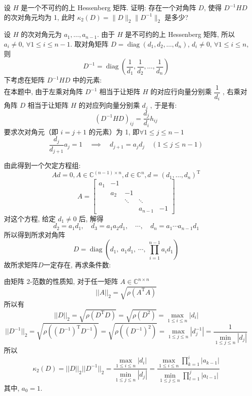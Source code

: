 \documentclass[12pt, answers]{exam}     %
\newcommand{\diag}{\operatorname{diag}}
\newcommand{\T}{\mathrm{T}}
\begin{document}
\begin{questions}
\question{}
设 \( H \) 是一个不可约的上 Hessenberg 矩阵. 证明: 存在一个对角阵 \( D \), 使得 \( D^{-1}HD \) 的次对角元均为 1, 此时 \( \kappa_2(D) = \|D\|_2\|D^{-1}\|_2 \) 是多少?
\begin{solution}设 \( H \) 的次对角元为 \( a_1, \ldots, a_{n-1} \). 由于 \( H \) 是不可约的上 Hessenberg 矩阵, 所以 \( a_i \neq 0 \), \( \forall 1 \le i \le n-1 \). 
取对角矩阵 \( D = \diag(d_1, d_2, \ldots, d_n) \), \( d_i \neq 0 \), \( \forall 1 \le i \le n \), 则
\[
D^{-1} = \diag\left( \frac{1}{d_1}, \frac{1}{d_2}, \ldots, \frac{1}{d_n} \right) 
\]
下考虑在矩阵 \( D^{-1}HD \) 中的元素:  \\ 
在本题中, 由于左乘对角阵 $ D^{-1} $ 相当于让矩阵 $ H $ 的对应行向量分别乘 $ \dfrac{1}{d_i} $ , 右乘对角阵 $ D $ 相当于让矩阵 $ H $ 的对应列向量分别乘 $ d_j $ , 
于是有: 
\[
(D^{-1}HD)_{ij} = \frac{d_j}{d_i} h_{ij}
\]
要求次对角元（即 \( i = j+1 \) 的元素）为 1, 即\( \forall 1 \leq j \leq n-1 \)
\[
\frac{d_j}{d_{j+1}} a_j = 1 \quad \implies \quad d_{j+1} = a_j d_j \quad (1 \leq j \leq n-1)
\]

由此得到一个欠定方程组: 
\[
Ad = 0, A \in \mathbb{C}^{(n-1) \times n}, d \in \mathbb{C}^n, d = (d_1, \dots, d_n)^{\T}
\]
\[
A = 
\begin{bmatrix}
a_1 & -1 & & \\
    & a_2 & -1 & \\
    &     & \ddots & \ddots \\
    &     &        & a_{n-1} & -1
\end{bmatrix}
\]
对这个方程, 给定 \(d_1 \neq 0\) 后, 解得
\[
d_2 = a_1 d_1, \quad d_3 = a_1 a_2 d_1, \quad \cdots, \quad d_n = a_1 \cdots a_{n-1} d_1
\]
所以得到所求对角阵
\[
D = \operatorname{diag}\left( d_1, \  a_1 d_1, \  \cdots, \  \prod_{i=1}^{n-1} a_i d_1 \right)
\]
故所求矩阵$D$一定存在, 再求条件数: 

由矩阵 2-范数的性质知, 对于任一矩阵 \( A \in \mathbb{C}^{n \times n} \)
\[
||A||_2 = \sqrt{\rho(A^{\T}A)}
\]
所以有
\[
||D||_2 = \sqrt{\rho(D^{\T}D)} = \sqrt{\rho(D^2)} = \max_{1 \leq i \leq n} |d_i|
\]
\[
||D^{-1}||_2 = \sqrt{\rho((D^{-1})^{\T}D^{-1})} = \sqrt{\rho((D^{-1})^2)} = \max_{1 \leq j \leq n} |d_j^{-1}| = \frac{1}{\min_{1 \leq j \leq n} |d_j|}
\]
所以
\[
\kappa_2(D) = ||D||_2||D^{-1}||_2 = \frac{\max_{1 \leq i \leq n} |d_i|}{\min_{1 \leq j \leq n} |d_j|}
= \frac{\max_{1 \leq i \leq n} \prod_{k=1}^{i} |a_{k-1}|}{\min_{1 \leq j \leq n} \prod_{l=1}^{j} |a_{l-1}|} 
\]
其中, \( a_0 = 1 \).
\end{solution}



\end{questions}
\end{document}
